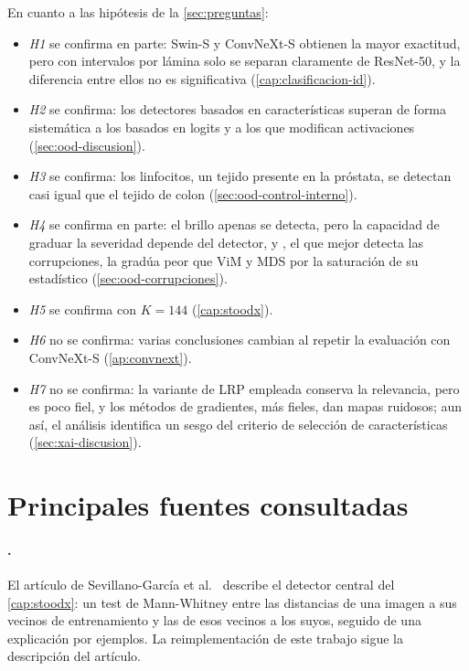 En cuanto a las hipótesis de la \cref{sec:preguntas}:
\begin{itemize}
  \item \emph{H1} se confirma en parte: Swin-S y ConvNeXt-S obtienen la mayor exactitud, pero con intervalos por lámina solo se separan claramente de ResNet-50, y la diferencia entre ellos no es significativa (\cref{cap:clasificacion-id}).
  \item \emph{H2} se confirma: los detectores basados en características superan de forma sistemática a los basados en logits y a los que modifican activaciones (\cref{sec:ood-discusion}).
  \item \emph{H3} se confirma: los linfocitos, un tejido presente en la próstata, se detectan casi igual que el tejido de colon (\cref{sec:ood-control-interno}).
  \item \emph{H4} se confirma en parte: el brillo apenas se detecta, pero la capacidad de graduar la severidad depende del detector, y \stoodx, el que mejor detecta las corrupciones, la gradúa peor que ViM y MDS por la saturación de su estadístico (\cref{sec:ood-corrupciones}).
  \item \emph{H5} se confirma con $K = 144$ (\cref{cap:stoodx}).
  \item \emph{H6} no se confirma: varias conclusiones cambian al repetir la evaluación con ConvNeXt-S (\cref{ap:convnext}).
  \item \emph{H7} no se confirma: la variante de LRP empleada conserva la relevancia, pero es poco fiel, y los métodos de gradientes, más fieles, dan mapas ruidosos; aun así, el análisis identifica un sesgo del criterio de selección de características (\cref{sec:xai-discusion}).
\end{itemize}

\section{Principales fuentes consultadas}\label{sec:fuentes}

\paragraph{\stoodx.} El artículo de Sevillano-García et al.~\cite{sevillano2026} describe el detector central del \cref{cap:stoodx}: un test de Mann-Whitney entre las distancias de una imagen a sus vecinos de entrenamiento y las de esos vecinos a los suyos, seguido de una explicación por ejemplos. La reimplementación de este trabajo sigue la descripción del artículo.

